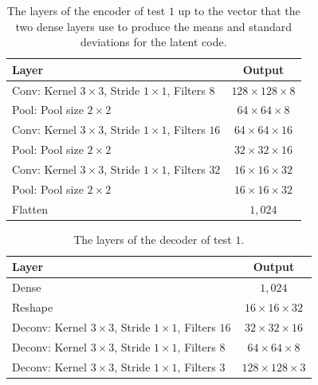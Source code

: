 \begin{center}
    \begin{table}[H] 
        \centering
        \begin{tabular}{ | l | c | }
            \hline
            Layer & Output\\ \hline
            Conv: Kernel $3\times3$, Stride $1\times1$, Filters $8  $    & $128\times 128\times 8  $    \\
            Pool: Pool size $2\times2$                                   & $64\times 64\times 8  $  \\
            Conv: Kernel $3\times3$, Stride $1\times1$, Filters $16 $    & $64\times 64\times 16 $    \\
            Pool: Pool size $2\times2$                                   & $32\times 32\times 16  $  \\
            Conv: Kernel $3\times3$, Stride $1\times1$, Filters $32 $    & $16\times 16\times 32 $    \\
            Pool: Pool size $2\times2$                                   & $16\times 16\times 32  $  \\
            Flatten                                                              & $1,024$            \\
            \hline
        \end{tabular} 
        \caption{The layers of the encoder of test $1$ up to the vector that the two dense layers use to produce 
        the means and standard deviations for the latent code.} \label{table_encoder_pooling}
    \end{table}
\end{center}
\vspace{-4em}
\begin{center}
    \begin{table}[H]
        \centering
        \begin{tabular}{ | l | c | }
            \hline
            Layer & Output\\ \hline
            Dense                                                            & $1,024$                   \\
            Reshape                                                          & $16\times 16\times  32 $  \\
            Deconv: Kernel $3\times3$, Stride $1\times1$, Filters $16 $      & $32\times 32\times  16 $  \\
            Deconv: Kernel $3\times3$, Stride $1\times1$, Filters $8  $      & $64\times 64\times  8  $  \\
            Deconv: Kernel $3\times3$, Stride $1\times1$, Filters $3  $      & $128\times 128\times3  $  \\
            \hline
        \end{tabular} 
        \caption{The layers of the decoder of test $1$.}
    \end{table}
\end{center}


